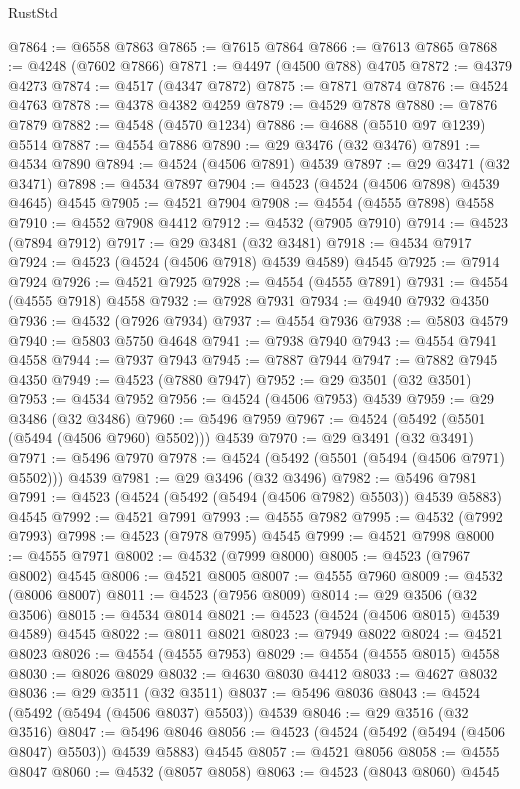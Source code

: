 \begin{lexlean}{RustStd}
\begin{coremodule}
@7864 := @6558 @7863
@7865 := @7615 @7864
@7866 := @7613 @7865
@7868 := @4248 (@7602 @7866)
@7871 := @4497 (@4500 @788) @4705
@7872 := @4379 @4273
@7874 := @4517 (@4347 @7872)
@7875 := @7871 @7874
@7876 := @4524 @4763
@7878 := @4378 @4382 @4259
@7879 := @4529 @7878
@7880 := @7876 @7879
@7882 := @4548 (@4570 @1234)
@7886 := @4688 (@5510 @97 @1239) @5514
@7887 := @4554 @7886
@7890 := @29 @3476 (@32 @3476)
@7891 := @4534 @7890
@7894 := @4524 (@4506 @7891) @4539
@7897 := @29 @3471 (@32 @3471)
@7898 := @4534 @7897
@7904 := @4523 (@4524 (@4506 @7898) @4539 @4645) @4545
@7905 := @4521 @7904
@7908 := @4554 (@4555 @7898) @4558
@7910 := @4552 @7908 @4412
@7912 := @4532 (@7905 @7910)
@7914 := @4523 (@7894 @7912)
@7917 := @29 @3481 (@32 @3481)
@7918 := @4534 @7917
@7924 := @4523 (@4524 (@4506 @7918) @4539 @4589) @4545
@7925 := @7914 @7924
@7926 := @4521 @7925
@7928 := @4554 (@4555 @7891)
@7931 := @4554 (@4555 @7918) @4558
@7932 := @7928 @7931
@7934 := @4940 @7932 @4350
@7936 := @4532 (@7926 @7934)
@7937 := @4554 @7936
@7938 := @5803 @4579
@7940 := @5803 @5750 @4648
@7941 := @7938 @7940
@7943 := @4554 @7941 @4558
@7944 := @7937 @7943
@7945 := @7887 @7944
@7947 := @7882 @7945 @4350
@7949 := @4523 (@7880 @7947)
@7952 := @29 @3501 (@32 @3501)
@7953 := @4534 @7952
@7956 := @4524 (@4506 @7953) @4539
@7959 := @29 @3486 (@32 @3486)
@7960 := @5496 @7959
@7967 := @4524 (@5492 (@5501 (@5494 (@4506 @7960) @5502))) @4539
@7970 := @29 @3491 (@32 @3491)
@7971 := @5496 @7970
@7978 := @4524 (@5492 (@5501 (@5494 (@4506 @7971) @5502))) @4539
@7981 := @29 @3496 (@32 @3496)
@7982 := @5496 @7981
@7991 := @4523 (@4524 (@5492 (@5494 (@4506 @7982) @5503)) @4539 @5883) @4545
@7992 := @4521 @7991
@7993 := @4555 @7982
@7995 := @4532 (@7992 @7993)
@7998 := @4523 (@7978 @7995) @4545
@7999 := @4521 @7998
@8000 := @4555 @7971
@8002 := @4532 (@7999 @8000)
@8005 := @4523 (@7967 @8002) @4545
@8006 := @4521 @8005
@8007 := @4555 @7960
@8009 := @4532 (@8006 @8007)
@8011 := @4523 (@7956 @8009)
@8014 := @29 @3506 (@32 @3506)
@8015 := @4534 @8014
@8021 := @4523 (@4524 (@4506 @8015) @4539 @4589) @4545
@8022 := @8011 @8021
@8023 := @7949 @8022
@8024 := @4521 @8023
@8026 := @4554 (@4555 @7953)
@8029 := @4554 (@4555 @8015) @4558
@8030 := @8026 @8029
@8032 := @4630 @8030 @4412
@8033 := @4627 @8032
@8036 := @29 @3511 (@32 @3511)
@8037 := @5496 @8036
@8043 := @4524 (@5492 (@5494 (@4506 @8037) @5503)) @4539
@8046 := @29 @3516 (@32 @3516)
@8047 := @5496 @8046
@8056 := @4523 (@4524 (@5492 (@5494 (@4506 @8047) @5503)) @4539 @5883) @4545
@8057 := @4521 @8056
@8058 := @4555 @8047
@8060 := @4532 (@8057 @8058)
@8063 := @4523 (@8043 @8060) @4545

\end{coremodule}
\end{lexlean}
